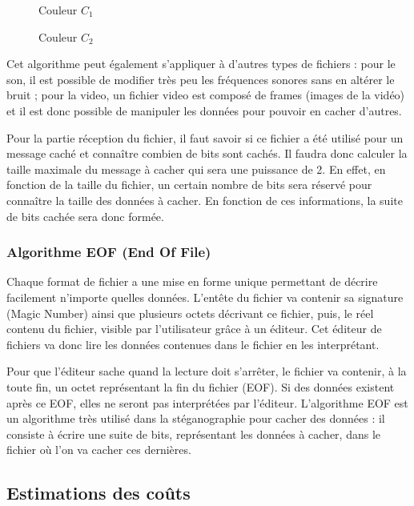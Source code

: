 \documentclass[11pt]{article}
\begin{document}
\begin{figure}[h]
 \begin{minipage}{.46\linewidth}
  \centering{}
  \caption{Couleur $C_1$}
 \end{minipage} \hfill
 \begin{minipage}{.46\linewidth}
  \centering{}
  \caption{Couleur $C_2$}
 \end{minipage}
\end{figure}

Cet algorithme peut également s'appliquer à d'autres types de fichiers : pour le son, il est possible de modifier très peu les fréquences sonores sans en altérer le bruit ; 
pour la video, un fichier video est composé de frames (images de la vidéo) et il est donc possible de manipuler les données pour pouvoir en cacher d'autres. 

Pour la partie réception du fichier, il faut savoir si ce fichier a été utilisé pour un message caché et connaître combien de bits sont cachés. 
Il faudra donc calculer la taille maximale du message à cacher qui sera une puissance de 2. En effet, en fonction de la taille du fichier, un certain nombre de bits sera réservé pour connaître la taille 
des données à cacher. 
En fonction de ces informations, la suite de bits cachée sera donc formée.

\subsubsection{Algorithme EOF (End Of File)}
Chaque format de fichier a une mise en forme unique permettant de décrire facilement n'importe quelles données. 
L'entête du fichier va contenir sa signature (Magic Number) ainsi que plusieurs octets décrivant ce fichier, puis, le réel contenu du fichier, visible par l'utilisateur grâce à un éditeur. 
Cet éditeur de fichiers va donc lire les données contenues dans le fichier en les interprétant. 

Pour que l'éditeur sache quand la lecture doit s'arrêter, le fichier va contenir, à la toute fin, un octet représentant la fin du fichier (EOF). 
Si des données existent après ce EOF, elles ne seront pas interprétées par l'éditeur. 
L'algorithme EOF est un algorithme très utilisé dans la stéganographie pour cacher des données : il consiste à écrire une suite de bits, représentant les données à cacher, dans le fichier où l'on va cacher ces dernières. 

\subsection{Estimations des coûts}
\end{document}
